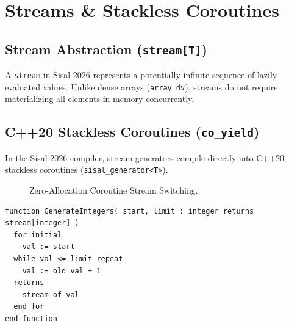 \chapter{Streams \& Stackless Coroutines}
\label{chap:coroutine_streams}

\section{Stream Abstraction (\texttt{stream[T]})}
A \texttt{stream} in Sisal-2026 represents a potentially infinite sequence of lazily evaluated values. Unlike dense arrays (\texttt{array\_dv}), streams do not require materializing all elements in memory concurrently.

\section{C++20 Stackless Coroutines (\texttt{co\_yield})}
In the Sisal-2026 compiler, stream generators compile directly into C++20 stackless coroutines (\texttt{sisal\_generator<T>}).

\begin{figure}[h!]
\centering
{}
\caption{Zero-Allocation Coroutine Stream Switching.}
\label{fig:coroutine_switch}
\end{figure}

\begin{lstlisting}[caption={Stream Generator Function}]
function GenerateIntegers( start, limit : integer returns stream[integer] )
  for initial
    val := start
  while val <= limit repeat
    val := old val + 1
  returns
    stream of val
  end for
end function
\end{lstlisting}

